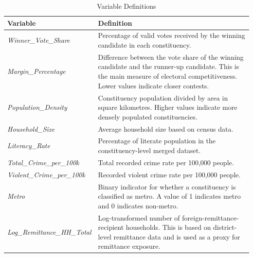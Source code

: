 \documentclass[12pt,a4paper]{article}
\begin{document}
\begin{table}[H]
\centering
\caption{Variable Definitions}
\label{tab:appendix_variables}
\footnotesize
\renewcommand{\arraystretch}{1.25}
\begin{tabular}{p{4cm}p{8.5cm}}
\toprule
\textbf{Variable} & \textbf{Definition} \\
\midrule

\textit{Winner\_Vote\_Share} 
& Percentage of valid votes received by the winning candidate in each constituency. \\

\textit{Margin\_Percentage} 
& Difference between the vote share of the winning candidate and the runner-up candidate. This is the main measure of electoral competitiveness. Lower values indicate closer contests. \\

\textit{Population\_Density} 
& Constituency population divided by area in square kilometres. Higher values indicate more densely populated constituencies. \\

\textit{Household\_Size} 
& Average household size based on census data. \\

\textit{Literacy\_Rate} 
& Percentage of literate population in the constituency-level merged dataset. \\

\textit{Total\_Crime\_per\_100k} 
& Total recorded crime rate per 100,000 people. \\

\textit{Violent\_Crime\_per\_100k} 
& Recorded violent crime rate per 100,000 people. \\

\textit{Metro} 
& Binary indicator for whether a constituency is classified as metro. A value of 1 indicates metro and 0 indicates non-metro. \\

\textit{Log\_Remittance\_HH\_Total} 
& Log-transformed number of foreign-remittance-recipient households. This is based on district-level remittance data and is used as a proxy for remittance exposure. \\

\bottomrule
\end{tabular}
\end{table}

\end{document}
